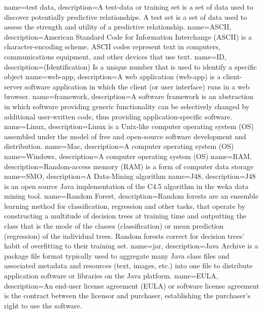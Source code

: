 {name=test data,
description={A test-data or training set is a set of data used to discover potentially predictive relationships. A test set is a set of data used to assess the strength and utility of a predictive relationship.}
} 
{
	name=ASCII,
	description={American Standard Code for Information Interchange (ASCII) is a character-encoding scheme. ASCII codes represent text in computers, communications equipment, and other devices that use text.}
} 
{
	name=ID,
	description={(Identification) Is a unique number that is used to identify a specific object
}
}
{
	name=web-app,
	description={A web application (web-app) is a client-server software application in which the client (or user interface) runs in a web browser. 
}
}
{
	name=framework,
	description={A software framework is an abstraction in which software providing generic functionality can be selectively changed by additional user-written code, thus providing application-specific software.}
}
{
	name=Linux,
	description={Linux is a Unix-like computer operating system (OS) assembled under the model of free and open-source software development and distribution.}
}
{
	name=Mac,
	description={A computer operating system (OS)}
}
{
	name=Windows,
	description={A computer operating system (OS)}
}
{
	name=RAM,
	description={Random-access memory (RAM) is a form of computer data storage}
}
{
	name=SMO,
	description={A Data-Mining algorithm}
}
{
	name=J48,
	description={J48 is an open source Java implementation of the C4.5 algorithm in the weka data mining tool.}
}
{
	name=Random Forest,
	description={Random forests are an ensemble learning method for classification, regression and other tasks, that operate by constructing a multitude of decision trees at training time and outputting the class that is the mode of the classes (classification) or mean prediction (regression) of the individual trees. Random forests correct for decision trees' habit of overfitting to their training set.}
}
{
	name=jar,
	description={Java Archive is a package file format typically used to aggregate many Java class files and associated metadata and resources (text, images, etc.) into one file to distribute application software or libraries on the Java platform.}
}
{
	name=EULA,
	description={An end-user license agreement (EULA) or software license agreement is the contract between the licensor and purchaser, establishing the purchaser's right to use the software.}
}
